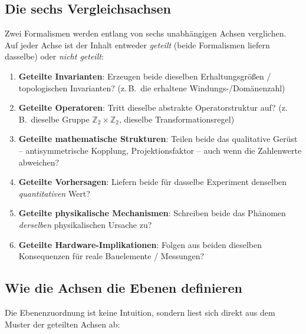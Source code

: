 \subsection{Die sechs Vergleichsachsen}

Zwei Formalismen werden entlang von sechs unabhängigen Achsen verglichen.
Auf jeder Achse ist der Inhalt entweder \emph{geteilt} (beide Formalismen
liefern dasselbe) oder \emph{nicht geteilt}:

\begin{enumerate}
  \item \textbf{Geteilte Invarianten}: Erzeugen beide dieselben
        Erhaltungsgrößen / topologischen Invarianten?
        (z.\,B.\ die erhaltene Windungs-/Domänenzahl)
  \item \textbf{Geteilte Operatoren}: Tritt dieselbe abstrakte
        Operatorstruktur auf? (z.\,B.\ dieselbe Gruppe
        $\mathbb{Z}_2\times\mathbb{Z}_2$, dieselbe Transformationsregel)
  \item \textbf{Geteilte mathematische Strukturen}: Teilen beide das
        qualitative Gerüst -- antisymmetrische Kopplung, Projektionsfaktor --
        auch wenn die Zahlenwerte abweichen?
  \item \textbf{Geteilte Vorhersagen}: Liefern beide für dasselbe
        Experiment denselben \emph{quantitativen} Wert?
  \item \textbf{Geteilte physikalische Mechanismen}: Schreiben beide das
        Phänomen \emph{derselben} physikalischen Ursache zu?
  \item \textbf{Geteilte Hardware-Implikationen}: Folgen aus beiden
        dieselben Konsequenzen für reale Bauelemente / Messungen?
\end{enumerate}

\subsection{Wie die Achsen die Ebenen definieren}

Die Ebenenzuordnung ist keine Intuition, sondern liest sich direkt aus
dem Muster der geteilten Achsen ab:

